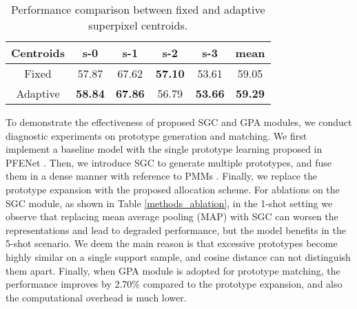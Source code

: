 \begin{table}[htbp]
\begin{center}
\begin{tabular}{|c|cccc|c|}
\hline
Centroids & s-0 & s-1 & s-2 & s-3 & mean\\ \hline \hline
Fixed       &  57.87       & 67.62       &  \textbf{57.10}     & 53.61    & 59.05 \\
Adaptive & \textbf{58.84}       & \textbf{67.86}       &  56.79     & \textbf{53.66}    & \textbf{59.29} \\ \hline
\end{tabular}
\end{center}
\caption{Performance comparison between fixed and adaptive superpixel centroids.}
\label{adaptive_proto}
\end{table}

\vspace{1mm}
To demonstrate the effectiveness of proposed SGC and GPA modules, we conduct diagnostic experiments on prototype generation and matching.
We first implement a baseline model with the single prototype learning proposed in PFENet \cite{pfenet}.
Then, we introduce SGC to generate multiple prototypes, and fuse them in a dense 
manner with reference to PMMs \cite{pmms}.
Finally, we replace the prototype expansion with the proposed allocation scheme.
For ablations on the SGC module, as shown in Table \ref{methods_ablation}, in the 1-shot setting we observe that replacing mean average pooling (MAP) with SGC can worsen the representations and lead to degraded performance, but the model benefits in the 5-shot scenario.
We deem the main reason is that excessive prototypes become highly similar on a single support sample, and cosine distance can not distinguish them apart.
Finally, when GPA module is adopted for prototype matching, the performance improves by 2.70\% compared to the prototype expansion, and also the computational overhead is
much lower.






